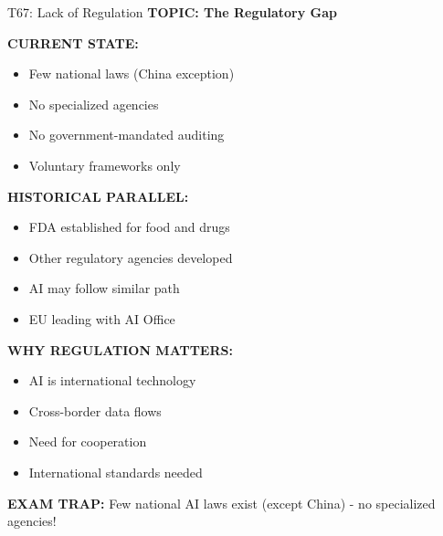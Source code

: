 \documentclass[8pt]{beamer}
\begin{document}
	\begin{frame}{T67: Lack of Regulation}
		\fontsize{6.5}{7.5}\selectfont
		\textbf{TOPIC: The Regulatory Gap}
		
		\vspace{0.1cm}
		\textbf{CURRENT STATE:}
		\begin{itemize}
			\item Few national laws (China exception)
			\item No specialized agencies
			\item No government-mandated auditing
			\item Voluntary frameworks only
		\end{itemize}
		
		\vspace{0.1cm}
		\textbf{HISTORICAL PARALLEL:}
		\begin{itemize}
			\item FDA established for food and drugs
			\item Other regulatory agencies developed
			\item AI may follow similar path
			\item EU leading with AI Office
		\end{itemize}
		
		\vspace{0.1cm}
		\textbf{WHY REGULATION MATTERS:}
		\begin{itemize}
			\item AI is international technology
			\item Cross-border data flows
			\item Need for cooperation
			\item International standards needed
		\end{itemize}
		
		\textcolor{myred}{\textbf{EXAM TRAP:}} Few national AI laws exist \textcolor{myblue}{(except China)} - no specialized agencies!
	\end{frame}
	
\end{document}
